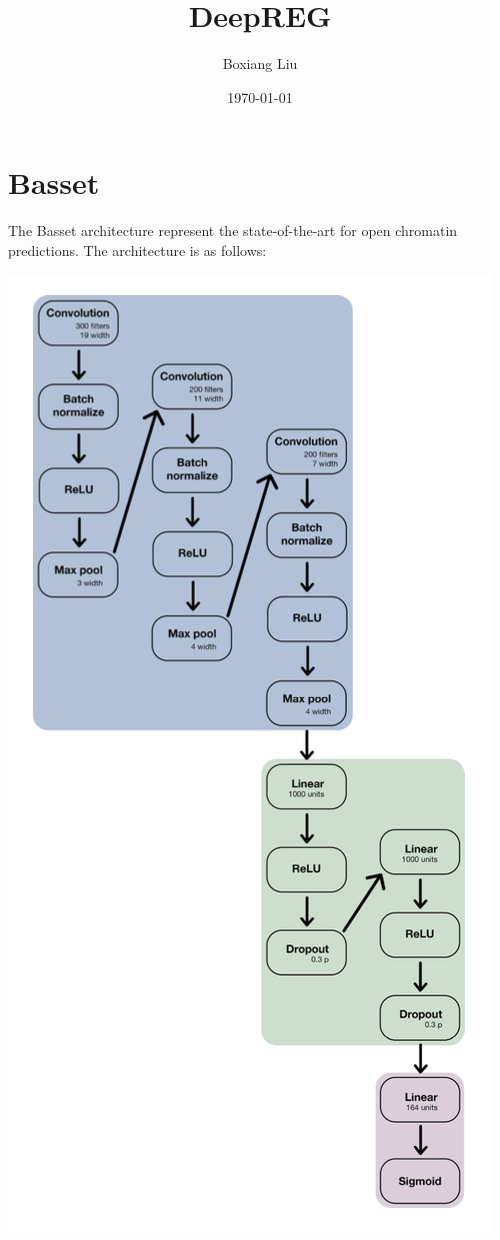 \documentclass{article}
\title{DeepREG}
\author{Boxiang Liu}
\date{\today}
\begin{document}
\maketitle
\tableofcontents


\section{Basset} 
The Basset architecture represent the state-of-the-art for open chromatin predictions. The architecture is as follows:

\includegraphics[width=\textwidth,height=\textheight,keepaspectratio]{modeling/basset/architecture.png}
\end{document}
